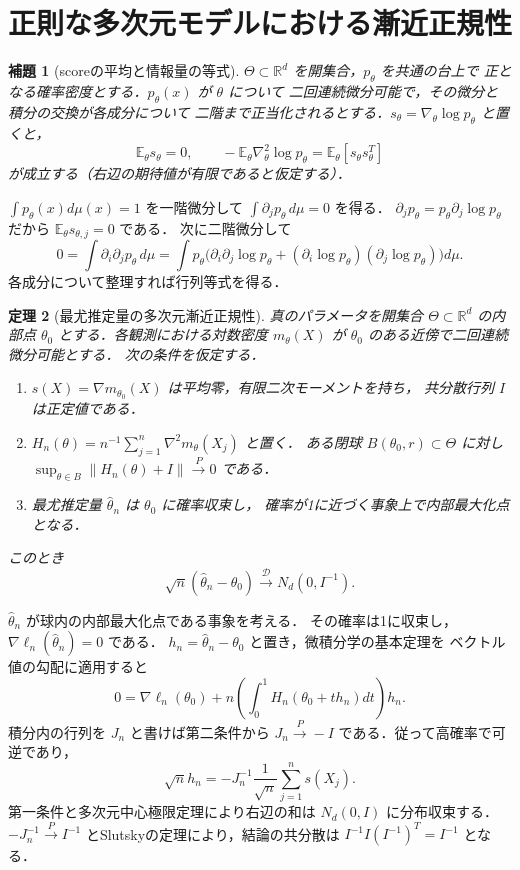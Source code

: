 \documentclass[a5paper,10pt,onecolumn]{jsarticle}
\makeatletter
\theoremstyle{mathnotetheorem}
\newtheorem{theorem}{定理}[section]
\newtheorem{lemma}[theorem]{補題}
\renewcommand{\proofname}{証明}
\renewenvironment{proof}[1][\proofname]{%
  \par\pushQED{\qed}\normalfont\topsep4\p@\@plus2\p@\relax
  \trivlist\item[\hskip\labelsep\bfseries #1]\ignorespaces
}{\popQED\endtrivlist\@endpefalse}
\newcommand{\norm}[1]{\lVert #1\rVert}
\makeatother
\begin{document}
\section{正則な多次元モデルにおける漸近正規性}
\begin{lemma}[scoreの平均と情報量の等式]
$\Theta\subset\mathbb R^d$ を開集合，$p_\theta$ を共通の台上で
正となる確率密度とする．$p_\theta(x)$ が $\theta$ について
二回連続微分可能で，その微分と積分の交換が各成分について
二階まで正当化されるとする．$s_\theta=\nabla_\theta\log p_\theta$
と置くと，
\[
 \mathbb E_\theta s_\theta=0,\qquad
 -\mathbb E_\theta\nabla^2_\theta\log p_\theta
 =\mathbb E_\theta[s_\theta s_\theta^T]
\]
が成立する（右辺の期待値が有限であると仮定する）．
\end{lemma}
\begin{proof}
$\int p_\theta(x)d\mu(x)=1$ を一階微分して
$\int \partial_jp_\theta\,d\mu=0$ を得る．
$\partial_jp_\theta=p_\theta\partial_j\log p_\theta$
だから $\mathbb E_\theta s_{\theta,j}=0$ である．
次に二階微分して
\[
 0=\int \partial_i\partial_jp_\theta\,d\mu
 =\int p_\theta\bigl(
 \partial_i\partial_j\log p_\theta+
 (\partial_i\log p_\theta)(\partial_j\log p_\theta)
 \bigr)d\mu.
\]
各成分について整理すれば行列等式を得る．
\end{proof}
\begin{theorem}[最尤推定量の多次元漸近正規性]\label{thm:regular_MLE}
真のパラメータを開集合 $\Theta\subset\mathbb R^d$ の内部点
$\theta_0$ とする．各観測における対数密度
$m_\theta(X)$ が $\theta_0$ のある近傍で二回連続微分可能とする．
次の条件を仮定する．
\begin{enumerate}
\item $s(X)=\nabla m_{\theta_0}(X)$ は平均零，有限二次モーメントを持ち，
共分散行列 $I$ は正定値である．
\item $H_n(\theta)=n^{-1}\sum_{j=1}^n\nabla^2m_\theta(X_j)$ と置く．
ある閉球 $B(\theta_0,r)\subset\Theta$ に対し
$\sup_{\theta\in B}\norm{H_n(\theta)+I}\xrightarrow{P}0$ である．
\item 最尤推定量 $\widehat\theta_n$ は $\theta_0$ に確率収束し，
確率が1に近づく事象上で内部最大化点となる．
\end{enumerate}
このとき
\[
 \sqrt n(\widehat\theta_n-\theta_0)
 \xrightarrow{\mathcal D}N_d(0,I^{-1}).
\]
\end{theorem}
\begin{proof}
$\widehat\theta_n$ が球内の内部最大化点である事象を考える．
その確率は1に収束し，$\nabla\ell_n(\widehat\theta_n)=0$ である．
$h_n=\widehat\theta_n-\theta_0$ と置き，微積分学の基本定理を
ベクトル値の勾配に適用すると
\[
 0=\nabla\ell_n(\theta_0)+
 n\left(\int_0^1H_n(\theta_0+th_n)dt\right)h_n.
\]
積分内の行列を $J_n$ と書けば第二条件から
$J_n\xrightarrow{P}-I$ である．従って高確率で可逆であり，
\[
 \sqrt n h_n=-J_n^{-1}\frac1{\sqrt n}
 \sum_{j=1}^ns(X_j).
\]
第一条件と多次元中心極限定理により右辺の和は
$N_d(0,I)$ に分布収束する．$-J_n^{-1}\xrightarrow{P}I^{-1}$
とSlutskyの定理により，結論の共分散は
$I^{-1}I(I^{-1})^T=I^{-1}$ となる．
\end{proof}
\end{document}
